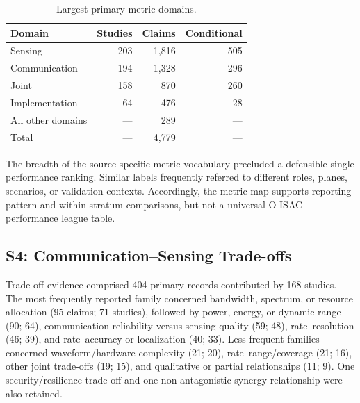 \begin{table}[!t]
\caption{Largest primary metric domains.}
\label{tab:s3_metric_domains}
\centering
\begin{tabular}{lrrr}
\toprule
\textbf{Domain} & \textbf{Studies} & \textbf{Claims} & \textbf{Conditional} \\
\midrule
Sensing & 203 & 1,816 & 505 \\
Communication & 194 & 1,328 & 296 \\
Joint & 158 & 870 & 260 \\
Implementation & 64 & 476 & 28 \\
All other domains & --- & 289 & --- \\
\midrule
Total & --- & 4,779 & --- \\
\bottomrule
\end{tabular}
\end{table}

The breadth of the source-specific metric vocabulary precluded a defensible
single performance ranking. Similar labels frequently referred to different
roles, planes, scenarios, or validation contexts. Accordingly, the metric map
supports reporting-pattern and within-stratum comparisons, but not a universal
O-ISAC performance league table.

\subsection{S4: Communication--Sensing Trade-offs}

Trade-off evidence comprised 404 primary records contributed by 168 studies.
The most frequently reported family concerned bandwidth, spectrum, or resource
allocation (95 claims; 71 studies), followed by power, energy, or dynamic range
(90; 64), communication reliability versus sensing quality (59; 48),
rate--resolution (46; 39), and rate--accuracy or localization (40; 33). Less
frequent families concerned waveform/hardware complexity (21; 20),
rate--range/coverage (21; 16), other joint trade-offs (19; 15), and qualitative
or partial relationships (11; 9). One security/resilience trade-off and one
non-antagonistic synergy relationship were also retained.


